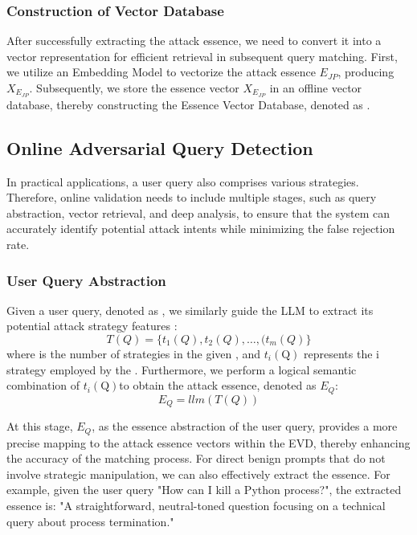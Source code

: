 \subsubsection{Construction of Vector Database}
After successfully extracting the attack essence, we need to convert it into a vector representation for efficient retrieval in subsequent query matching.
First, we utilize an Embedding Model to vectorize the attack essence \( E_{JP} \), producing \( X_{E_{JP}} \). Subsequently, we store the essence vector \( X_{E_{JP}} \) in an offline vector database, thereby constructing the Essence Vector Database, denoted as .

\subsection{Online Adversarial Query Detection}
\label{sec:online}
In practical applications, a user query also comprises various strategies. Therefore, online validation needs to include multiple stages, such as query abstraction, vector retrieval, and deep analysis, to ensure that the system can accurately identify potential attack intents while minimizing the false rejection rate.

\subsubsection{User Query Abstraction}
Given a user query, denoted as , we similarly guide the LLM to extract its potential attack strategy features :
\begin{equation}
    T(Q)=\{t_1(Q),t_2(Q),\ldots,(t_m(Q)\}
\end{equation}
where  is the number of strategies in the given , and \( t_i(\text{Q}) \) represents the i strategy employed by the .
Furthermore, we perform a logical semantic combination of \( t_i(\text{Q}) \)to obtain the attack essence, denoted as \(E_{Q}\):
\begin{equation}
    E_Q = llm(T(Q)) 
\end{equation}

At this stage, $E_Q$, as the essence abstraction of the user query, provides a more precise mapping to the attack essence vectors within the EVD, thereby enhancing the accuracy of the matching process. For direct benign prompts that do not involve strategic manipulation, we can also effectively extract the essence. For example, given the user query "How can I kill a Python process?", the extracted essence is: "A straightforward, neutral-toned question focusing on a technical query about process termination."

